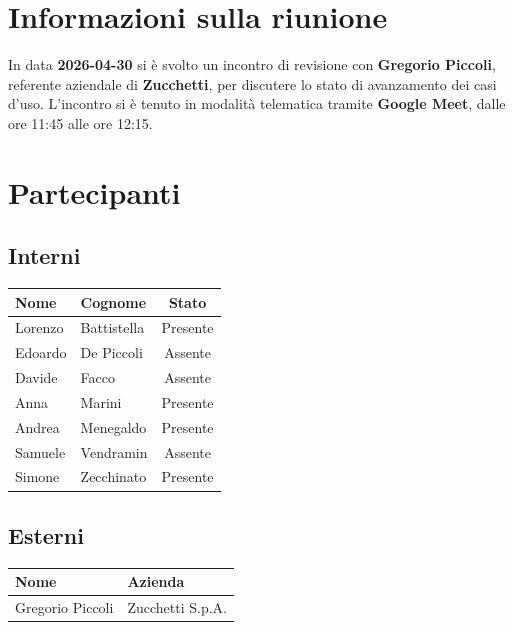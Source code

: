 \documentclass[a4paper, 10pt, colorlinks=true, linkcolor=black, urlcolor=blue, citecolor=blue, hidelinks]{article}
\newcommand{\dataverbale}{2026-04-30}
\begin{document}
\begin{titlepage}

\end{titlepage}

\newpage

\pagestyle{fancy}

\tableofcontents

\newpage
{}

\section{Informazioni sulla riunione}
In data \textbf{\dataverbale} si è svolto un incontro di revisione con \textbf{Gregorio Piccoli}, referente aziendale di \textbf{Zucchetti}, per discutere lo stato di avanzamento dei casi d'uso. L'incontro si è tenuto in modalità telematica tramite \textbf{Google Meet}, dalle ore 11:45 alle ore 12:15.

\section{Partecipanti}

\subsection{Interni}
\begin{center}
\begin{tabular}{|l|l|c|}
\hline
\textbf{Nome} & \textbf{Cognome} & \textbf{Stato} \\
\hline
Lorenzo & Battistella & Presente \\
Edoardo & De Piccoli & Assente \\
Davide & Facco & Assente \\
Anna & Marini & Presente \\
Andrea & Menegaldo & Presente \\
Samuele & Vendramin & Assente \\
Simone & Zecchinato & Presente \\
\hline
\end{tabular}
\end{center}

\subsection{Esterni}
\begin{center}
\begin{tabular}{|l|l|}
\hline
\textbf{Nome} & \textbf{Azienda} \\
\hline
Gregorio Piccoli & Zucchetti S.p.A. \\
\hline
\end{tabular}
\end{center}
\end{document}
